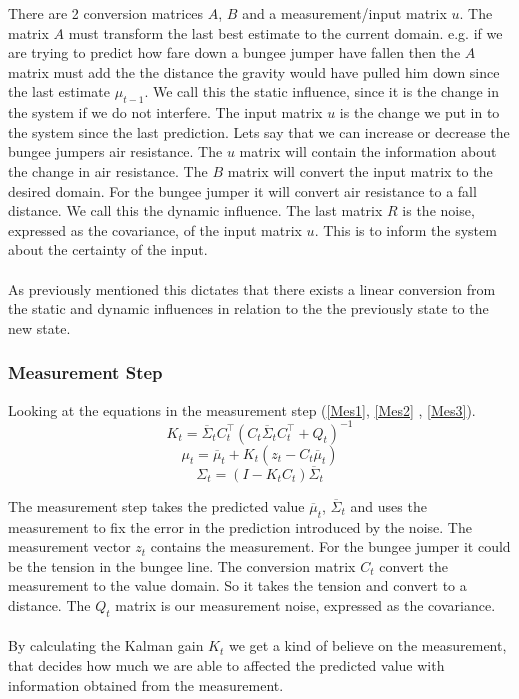 There are 2 conversion matrices $A$, $B$ and a measurement/input matrix $u$. The matrix $A$ must transform the last best estimate to the current domain. e.g. if we are trying to predict how fare down a bungee jumper have fallen then the $A$ matrix must add the the distance the gravity would have pulled him down since the last estimate $\mu_{t-1}$. We call this the static influence, since it is the change in the system if we do not interfere. The input matrix $u$ is the change we put in to the system since the last prediction. Lets say that we can increase or decrease the bungee jumpers air resistance. The $u$ matrix will contain the information about the change in air resistance. The $B$ matrix will convert the input matrix to the desired domain. For the bungee jumper it will convert air resistance to a fall distance. We call this the dynamic influence.
The last matrix $R$ is the noise, expressed as the covariance, of the input matrix $u$. This is to inform the system about the certainty of the input. 
\\\\
As previously mentioned this dictates that there exists a linear conversion from the static and dynamic influences in relation to the the previously state to the new state. 

\subsubsection{Measurement Step}
Looking at the equations in the measurement step (\ref{Mes1}, \ref{Mes2} , \ref{Mes3}).
\begin{equation}
K_t = \overline{\Sigma}_t C^{\intercal}_t ( C_t \overline{\Sigma}_t C^{\intercal}_t + Q_t ) ^{-1}
\label{Mes1}
\end{equation}
\begin{equation}
\mu_{t} = \overline{\mu}_t +K_t (z_t-C_t\overline{\mu}_t)
\label{Mes2}
\end{equation}
\begin{equation}
\Sigma_t = (I-K_t C_t) \overline{\Sigma}_t
\label{Mes3}
\end{equation}

The measurement step takes the predicted value $\overline{\mu}_t$, $\overline{\Sigma}_t$ and uses the measurement to fix the error in the prediction introduced by the noise. The measurement vector $z_t$ contains the measurement. For the bungee jumper it could be the tension in the bungee line. The conversion matrix $C_t$ convert the measurement to the value domain. So it takes the tension and convert to a distance. The $Q_t$ matrix is our measurement noise, expressed as the covariance.
\\\\
By calculating the Kalman gain $K_t$ we get a kind of believe on the measurement, that decides how much we are able to affected the predicted value with information obtained from the measurement. 

